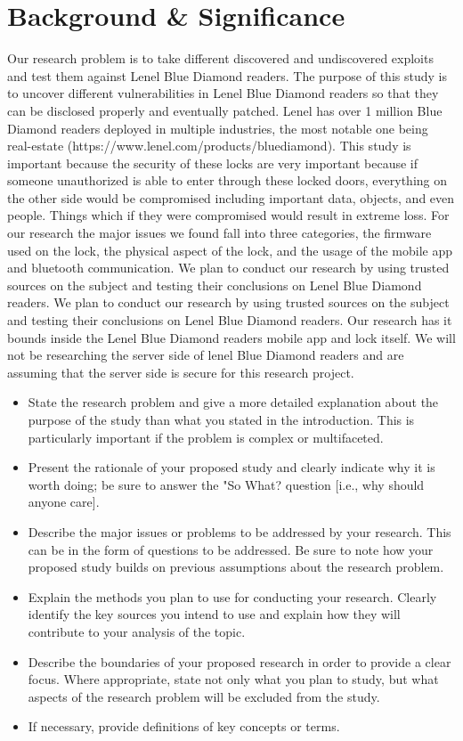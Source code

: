 \documentclass[10pt,twocolumn,letterpaper]{article}
\begin{document}
\section{Background \& Significance}
Our research problem is to take different discovered and undiscovered exploits and test them against Lenel Blue Diamond readers. The purpose of this study is to uncover different vulnerabilities in Lenel Blue Diamond readers so that they can be disclosed properly and eventually patched. Lenel has over 1 million Blue Diamond readers deployed in multiple industries, the most notable one being real-estate (https://www.lenel.com/products/bluediamond). This study is important because the security of these locks are very important because if someone unauthorized is able to enter through these locked doors, everything on the other side would be compromised including important data, objects, and even people. Things which if they were compromised would result in extreme loss. For our research the major issues we found fall into three categories, the firmware used on the lock, the physical aspect of the lock, and the usage of the mobile app and bluetooth communication. We plan to conduct our research by using trusted sources on the subject and testing their conclusions on Lenel Blue Diamond readers. We plan to conduct our research by using trusted sources on the subject and testing their conclusions on Lenel Blue Diamond readers. Our research has it bounds inside the Lenel Blue Diamond readers mobile app and lock itself. We will not be researching the server side of lenel Blue Diamond readers and are assuming that the server side is secure for this research project.


\begin{itemize}
   \item State the research problem and give a more detailed explanation about the purpose of the study than what you stated in the introduction. This is particularly important if the problem is complex or multifaceted.
    \item Present the rationale of your proposed study and clearly indicate why it is worth doing; be sure to answer the "So What? question [i.e., why should anyone care].
    \item Describe the major issues or problems to be addressed by your research. This can be in the form of questions to be addressed. Be sure to note how your proposed study builds on previous assumptions about the research problem.
    \item Explain the methods you plan to use for conducting your research. Clearly identify the key sources you intend to use and explain how they will contribute to your analysis of the topic.
   \item Describe the boundaries of your proposed research in order to provide a clear focus. Where appropriate, state not only what you plan to study, but what aspects of the research problem will be excluded from the study.
   \item If necessary, provide definitions of key concepts or terms.
\end{itemize}
\end{document}
